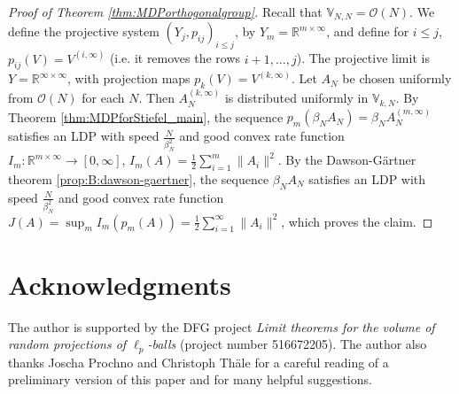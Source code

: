 \documentclass[11pt,a4paper,twoside]{article}
\newcommand{\R}{\mathbb R}
\renewcommand{\O}{\mathcal O}
\theoremstyle{definition}
\begin{document}
		
		\begin{proof}[Proof of Theorem \ref{thm:MDPorthogonalgroup}]	
		Recall that $\mathbb{V}_{N,N} = \O(N)$. We define the projective system $\left({Y}_j, p_{i j}\right)_{i \leq j}$, by ${Y}_m =\R^{m\times \infty}$, and define for $i\le j$, $p_{ij}(V) = V^{(i, \infty)}$ (i.e. it removes the rows $i+1,...,j$). The projective limit is ${Y} = \R^{\infty\times\infty}$, with projection maps $p_k(V) = V^{(k,\infty)}$. Let $A_N$ be chosen uniformly from $\O(N)$ for each $N$. Then $A_N^{(k,\infty)}$ is distributed uniformly in $\mathbb{V}_{k,N}$. By Theorem \ref{thm:MDPforStiefel_main}, the sequence $p_m(\beta_N A_N) = \beta_N A_N^{(m,\infty)}$ satisfies an LDP with speed $\frac{N}{\beta_N^2}$ and good convex rate function $I_m:\R^{m\times\infty}\to[0,\infty]$, $I_m(A) = \frac{1}{2}\sum_{i=1}^m \|A_i\|^2$. By the Dawson-Gärtner theorem \ref{prop:B:dawson-gaertner}, the sequence $\beta_N A_N$ satisfies an LDP with speed $\frac{N}{\beta_N^2}$ and good convex rate function $J(A) = \sup_{m}I_m(p_m(A)) = \frac{1}{2}\sum_{i=1}^\infty \|A_i\|^2$, which proves the claim. 
		\end{proof}


\section*{Acknowledgments}

The author is supported by the DFG project \emph{Limit theorems for the volume of random projections of $\ell_p$-balls} (project number 516672205). The author also thanks Joscha Prochno and Christoph Th\"ale for a careful reading of a preliminary version of this paper and for many helpful suggestions.
\end{document}
